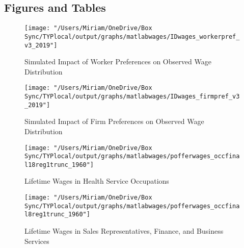 \documentclass[12pt]{article}
\begin{document}
\newpage

\clearpage


\subsection{Figures and Tables}



\begin{figure}[H]
\centering
\caption{Simulated Impact of Worker Preferences on Observed Wage Distribution}
\label{workerpref}
\texttt{[image: "/Users/Miriam/OneDrive/Box Sync/TYPlocal/output/graphs/matlabwages/IDwages\_workerpref\_v3\_2019"]}
\end{figure}

\begin{figure}[H]
\centering
\caption{Simulated Impact of Firm Preferences on Observed Wage Distribution}
\label{firmpref}
\texttt{[image: "/Users/Miriam/OneDrive/Box Sync/TYPlocal/output/graphs/matlabwages/IDwages\_firmpref\_v3\_2019"]}
\end{figure}



\begin{figure}[H]
\centering
\caption{Lifetime Wages in Health Service Occupations}
\label{health}
\texttt{[image: "/Users/Miriam/OneDrive/Box Sync/TYPlocal/output/graphs/matlabwages/pofferwages\_occfinal18reg1trunc\_1960"]}
\end{figure}

\begin{figure}[H]
\centering
\caption{Lifetime Wages in Sales Representatives, Finance, and Business Services}
\label{sales}
\texttt{[image: "/Users/Miriam/OneDrive/Box Sync/TYPlocal/output/graphs/matlabwages/pofferwages\_occfinal8reg1trunc\_1960"]}
\end{figure}
\end{document}
